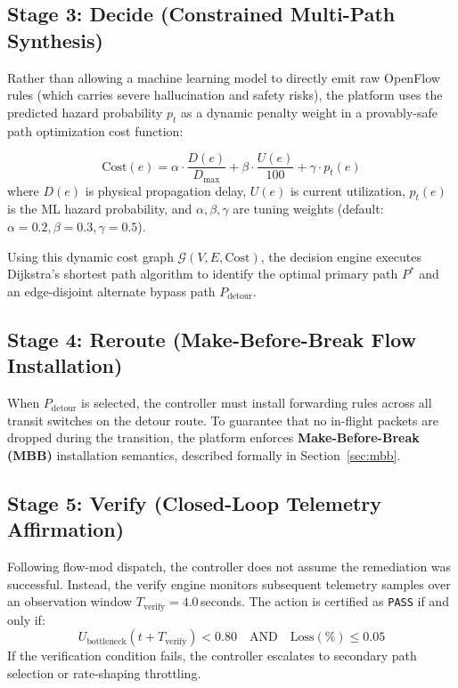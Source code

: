 \subsection{Stage 3: Decide (Constrained Multi-Path Synthesis)}
Rather than allowing a machine learning model to directly emit raw OpenFlow rules (which carries severe hallucination and safety risks), the platform uses the predicted hazard probability $p_t$ as a dynamic penalty weight in a provably-safe path optimization cost function:

\begin{equation}
  \text{Cost}(e) = \alpha \cdot \frac{D(e)}{D_{\text{max}}} + \beta \cdot \frac{U(e)}{100} + \gamma \cdot p_t(e)
\end{equation}
where $D(e)$ is physical propagation delay, $U(e)$ is current utilization, $p_t(e)$ is the ML hazard probability, and $\alpha, \beta, \gamma$ are tuning weights (default: $\alpha=0.2, \beta=0.3, \gamma=0.5$). 

Using this dynamic cost graph $\mathcal{G}(V, E, \text{Cost})$, the decision engine executes Dijkstra's shortest path algorithm to identify the optimal primary path $P^*$ and an edge-disjoint alternate bypass path $P_{\text{detour}}$.

\subsection{Stage 4: Reroute (Make-Before-Break Flow Installation)}
When $P_{\text{detour}}$ is selected, the controller must install forwarding rules across all transit switches on the detour route. To guarantee that no in-flight packets are dropped during the transition, the platform enforces \textbf{Make-Before-Break (MBB)} installation semantics, described formally in Section~\ref{sec:mbb}.

\subsection{Stage 5: Verify (Closed-Loop Telemetry Affirmation)}
Following flow-mod dispatch, the controller does not assume the remediation was successful. Instead, the verify engine monitors subsequent telemetry samples over an observation window $T_{\text{verify}} = 4.0$\,seconds. The action is certified as \texttt{PASS} if and only if:
\begin{equation}
  U_{\text{bottleneck}}(t + T_{\text{verify}}) < 0.80 \quad \text{AND} \quad \text{Loss}(\%) \le 0.05
\end{equation}
If the verification condition fails, the controller escalates to secondary path selection or rate-shaping throttling.

